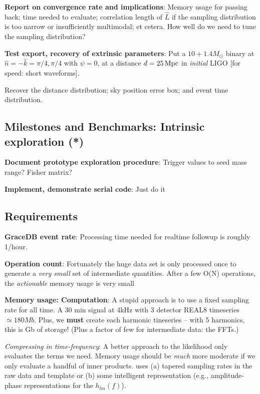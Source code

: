 \documentclass[twocolumn,prd,nofootinbib]{revtex4}
\newcommand\unit[1]{\, {\rm #1}}
\begin{document}
\begin{widetext}
\noindent \textbf{Report on convergence rate and implications}: Memory usage for passing back; time needed to evaluate;
correlation length of $\hat{L}$ if the sampling distribution is too narrow or insufficiently multimodal; et cetera.  How well do we need to tune the sampling distribution?


\noindent \textbf{Test export, recovery of extrinsic parameters}: Put a $10+1.4 M_\odot$ binary  at
$\hat{n}=-\hat{k}=\pi/4,\pi/4$ with $\psi=0$, at a distance $d=25\unit{Mpc}$ in \emph{initial} LIGO [for speed: short
  waveforms].  

Recover the distance distribution;  sky position error box; and event time distribution.

\subsection{Milestones and Benchmarks:  Intrinsic exploration (*)}

\noindent \textbf{Document prototype exploration procedure}: Trigger values to seed mass range? Fisher matrix?


\noindent \textbf{Implement, demonstrate serial code}: Just do it





\end{widetext}
\subsection{Requirements}

\noindent \textbf{GraceDB event rate}: Processing time needed for realtime followup is roughly 1/hour.

\noindent \textbf{Operation count}: Fortunately the huge data set is only processed once to generate a \emph{very small}
set of intermediate quantities.  After a few O(N) operations, the \emph{actionable} memory usage is very small


\noindent \textbf{Memory usage: Computation}: A stupid approach is to use a fixed sampling rate for all time.
%
A 30 min signal at 4kHz with 3 detector REAL8 timeseries $\simeq 180 Mb$.
Plus, we \textbf{must} create each harmonic tineseries -- with 5 harmonics, this is Gb of storage!  (Plus a factor of few for intermediate
data: the FFTs.)

\noindent \emph{Compressing in time-frequency}: A better approach to the likelihood only evaluates the terms we need.
Memory usage should be \emph{much} more moderate if we only evaluate a handful of inner products. uses (a) tapered sampling rates in
the raw data and template or (b) some intelligent representation (e.g., amplitude-phase representations for the $h_{lm}(f)$).
\end{document}

